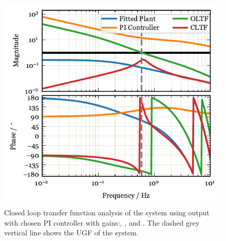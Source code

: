 \begin{figure}[!ht]
 \centering
 \includegraphics[width=\linewidth]{figures/Afrac_LoopStability.pdf}
 \caption{
Closed loop transfer function analysis of the system  using \Afrac output with chosen PI controller with gains:\AfracKp, \AfracTi, and \Afracstau.
The dashed grey vertical line shows the \ac{UGF} of the system.}
\label{fig:cltf_afrac}
\end{figure}